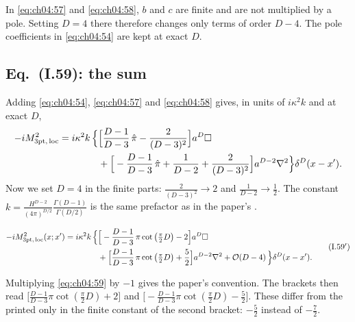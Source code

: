 In \eqref{eq:ch04:57} and \eqref{eq:ch04:58}, $b$ and $c$ are finite and are not multiplied by a pole.
Setting $D=4$ there therefore changes only terms of order $D-4$.
The pole coefficients in \eqref{eq:ch04:54} are kept at exact $D$.

\subsection{Eq.~(I.59): the sum \texorpdfstring{\tD}{}}

Adding \eqref{eq:ch04:54}, \eqref{eq:ch04:57} and \eqref{eq:ch04:58} gives, in units of $i\kappa^2k$ and at exact $D$,
\begin{equation}
\begin{aligned}
-iM^2_{\rm 3pt,\,loc}=i\kappa^2k\,\Big\{&\Big[\frac{D-1}{D-3}\,\hat\pi-\frac{2}{(D-3)^2}\Big]a^D\square\\
&+\Big[-\frac{D-1}{D-3}\,\hat\pi+\frac{1}{D-2}+\frac{2}{(D-3)^2}\Big]a^{D-2}\nabla^2\Big\}\delta^D(x-x').
\end{aligned}
\label{eq:ch04:59exact}
\end{equation}
Now we set $D=4$ in the finite parts: $\frac{2}{(D-3)^2}\to2$ and $\frac{1}{D-2}\to\frac12$.
The constant $k=\frac{H^{D-2}}{(4\pi)^{D/2}}\frac{\Gamma(D-1)}{\Gamma(D/2)}$ is the same prefactor as in the paper's .
\begin{resultbox}
\begin{equation*}
\begin{aligned}
-iM^2_{\rm 3pt,\,loc}(x;x')=i\kappa^2k\,\Big\{&\Big[-\frac{D-1}{D-3}\,\pi\cot\big(\tfrac{\pi}{2}D\big)-2\Big]a^D\square\\
&+\Big[\frac{D-1}{D-3}\,\pi\cot\big(\tfrac{\pi}{2}D\big)+\frac52\Big]a^{D-2}\nabla^2+\mathcal{O}\!\left(D-4\right)\Big\}\delta^D(x-x').
\end{aligned}
\tag{I.59$'$}\label{eq:ch04:59}
\end{equation*}
\end{resultbox}
\noindent
Multiplying \eqref{eq:ch04:59} by $-1$ gives the paper's convention.
The brackets then read $\big[\frac{D-1}{D-3}\pi\cot(\frac\pi2D)+2\big]$ and $\big[-\frac{D-1}{D-3}\pi\cot(\frac\pi2D)-\frac52\big]$.
These differ from the printed  only in the finite constant of the second bracket: $-\frac52$ instead of $-\frac72$.

